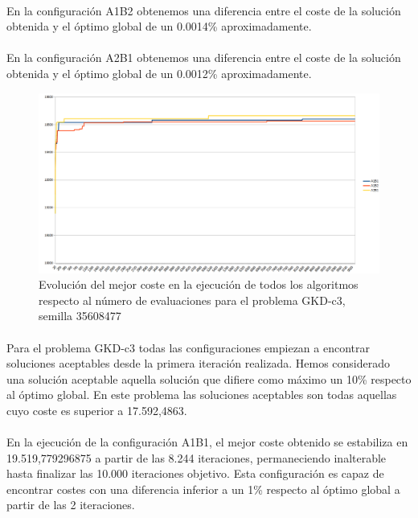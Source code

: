 	\paragraph{}En la configuración A1B2 obtenemos una diferencia entre el coste de la solución obtenida y el óptimo global de un 0.0014\% aproximadamente.
	
	\paragraph{}En la configuración A2B1 obtenemos una diferencia entre el coste de la solución obtenida y el óptimo global de un 0.0012\% aproximadamente.

	\begin{figure}[H]
		\centering
		\includegraphics[scale=0.3]{img/GKD3conver.png}
		\caption{Evolución del mejor coste en la ejecución de todos los algoritmos respecto al número de evaluaciones para el problema GKD-c3, semilla 35608477}
		\label{gkd-c3_historico}
	\end{figure}

	\paragraph{}Para el problema GKD-c3 todas las configuraciones empiezan a encontrar soluciones aceptables desde la primera iteración realizada. Hemos considerado una solución aceptable aquella solución que difiere como máximo un 10\% respecto al óptimo global. En este problema las soluciones aceptables son todas aquellas cuyo coste es superior a 17.592,4863.
	
	\paragraph{}En la ejecución de la configuración A1B1, el mejor coste obtenido se estabiliza en 19.519,779296875 a partir de las 8.244 iteraciones, permaneciendo inalterable hasta finalizar las 10.000 iteraciones objetivo. Esta configuración es capaz de encontrar costes con una diferencia inferior a un 1\% respecto al óptimo global a partir de las 2 iteraciones.
	
